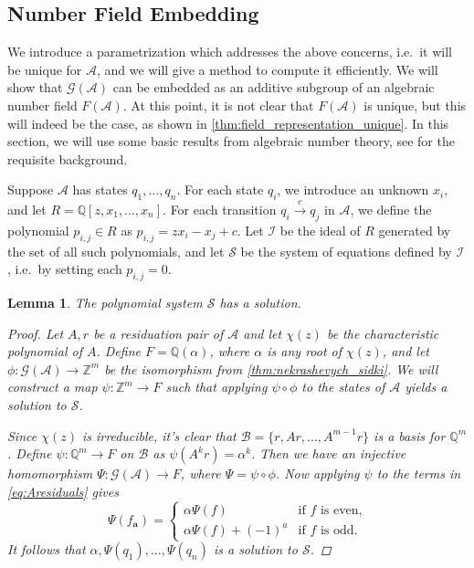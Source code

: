 \documentclass[12pt, letterpaper]{article}
\newcommand{\Z}{\mathbb Z}
\newcommand{\Q}{\mathbb Q}
\newcommand{\A}{\mathcal A}
\newcommand{\ch}[1]{\mathbf{#1}}
\newcommand{\res}[2]{{{#1}_{\ch{#2}}}}
\newcommand{\I}{\mathcal I}
\renewcommand{\S}{\mathcal S}
\newcommand{\gp}{\mathcal G}
\newtheorem{lemma}[thm]{Lemma}
\begin{document}
\subsection{Number Field Embedding}\label{sec:field-rep}
We introduce a parametrization which addresses the above concerns, i.e.\ it
will be unique for $\A$, and we will give a method to compute it efficiently.
We will show that $\gp(\A)$ can be embedded as an additive subgroup of an
algebraic number field $F(\A)$. At this point, it is not clear that $F(\A)$ is
unique, but this will indeed be the case, as shown in
\cref{thm:field_representation_unique}.  In this section, we will use some
basic results from algebraic number theory, see \cite{ireland1990classical,
stein2012algebraic} for the requisite background.

Suppose $\A$ has states $q_1, \ldots, q_n$. For each state $q_i$, we introduce
an unknown $x_i$, and let $R = \Q[z, x_1, \ldots, x_n]$. For each transition
$q_i \xrightarrow{c} q_j$ in $\A$, we define the polynomial
$p_{i,j} \in R$ as $p_{i,j} = z x_i - x_j + c$. Let $\I$ be the ideal of $R$
generated by the set of all such polynomials, and let $\S$ be the system of
equations defined by $\I$, i.e.\ by setting each $p_{i,j} = 0$.

\begin{lemma}\label{lemma:solution_exists}
    The polynomial system $\S$ has a solution.
    \begin{proof}
        Let $A, r$ be a residuation pair of $\A$ and let $\chi(z)$ be the
        characteristic polynomial of $A$. Define $F = \Q(\alpha)$, where
        $\alpha$ is any root of $\chi(z)$, and let $\phi : \gp(\A) \rightarrow
        \Z^m$ be the isomorphism from \cref{thm:nekrashevych_sidki}. We will
        construct a map $\psi: \Z^m \rightarrow F$ such that applying $\psi
        \circ \phi$ to the states of $\A$ yields a solution to $\S$.

        Since $\chi(z)$ is irreducible, it's clear that $\mathcal B = \{r, Ar,
        \ldots, A^{m-1}r\}$ is a basis for $\Q^m$.  Define $\psi : \Q^m
        \rightarrow F$ on $\mathcal B$ as $\psi(A^k r) = \alpha^k$.  Then we
        have an injective homomorphism $\Psi: \gp(\A) \rightarrow F$, where
        $\Psi = \psi \circ \phi$.  Now applying $\psi$ to the terms in
        \cref{eq:Aresiduals} gives
        \begin{equation}
            \label{eq:aresiduals} \Psi(\res{f}{a}) = \begin{cases}
                \alpha \Psi(f) & \text{if $f$ is even,}\\
                \alpha \Psi(f) + (-1)^a & \text{if $f$ is odd.}
            \end{cases}
        \end{equation}
        It follows that $\alpha, \Psi(q_1), \ldots, \Psi(q_n)$ is a solution to
        $\S$.
    \end{proof}
\end{lemma}
\end{document}
